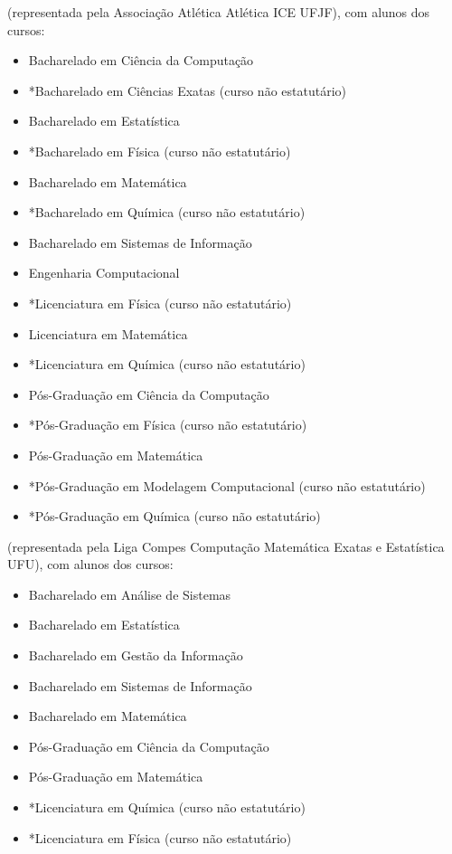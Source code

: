 \begin{article}
\begin{description}[noitemsep]
		\item[UFJF] (representada pela Associação Atlética Atlética ICE UFJF), com alunos dos cursos:
		\begin{itemize}[noitemsep]
			\item Bacharelado em Ciência da Computação
			\item *Bacharelado em Ciências Exatas (curso não estatutário)
			\item Bacharelado em Estatística
			\item *Bacharelado em Física (curso não estatutário)
			\item Bacharelado em Matemática
			\item *Bacharelado em Química (curso não estatutário)
			\item Bacharelado em Sistemas de Informação
			\item Engenharia Computacional
			\item *Licenciatura em Física (curso não estatutário)
			\item Licenciatura em Matemática
			\item *Licenciatura em Química (curso não estatutário)
			\item Pós-Graduação em Ciência da Computação
			\item *Pós-Graduação em Física (curso não estatutário)
			\item Pós-Graduação em Matemática
			\item *Pós-Graduação em Modelagem Computacional (curso não estatutário)
			\item *Pós-Graduação em Química (curso não estatutário)
		\end{itemize}

		\item[UFU] (representada pela Liga Compes Computação Matemática Exatas e Estatística UFU), com alunos dos cursos:
		\begin{itemize}[noitemsep]
			\item Bacharelado em Análise de Sistemas
			\item Bacharelado em Estatística
			\item Bacharelado em Gestão da Informação
			\item Bacharelado em Sistemas de Informação
			\item Bacharelado em Matemática
			\item Pós-Graduação em Ciência da Computação
			\item Pós-Graduação em Matemática
			\item *Licenciatura em Química (curso não estatutário)
			\item *Licenciatura em Física (curso não estatutário)
		\end{itemize}


\end{description}
\end{article}
